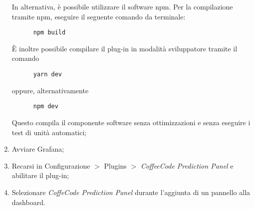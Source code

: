 \documentclass[../manuale-sviluppatore.tex]{subfiles}
\begin{document}
\begin{enumerate}
\begin{verbatim}
    \end{verbatim}
    In alternativa, è possibile utilizzare il software npm. Per la compilazione tramite npm, eseguire il seguente comando da terminale:
    \begin{verbatim}
      npm build
    \end{verbatim}
    È inoltre possibile compilare il plug-in in modalità sviluppatore tramite il comando
    \begin{verbatim}
      yarn dev
    \end{verbatim}
    oppure, alternativamente
    \begin{verbatim}
      npm dev
    \end{verbatim}
    Questo compila il componente software senza ottimizzazioni e senza eseguire i test di unità automatici;
    \item Avviare Grafana;
    \item Recarsi in Configurazione $>$ Plugins $>$ \emph{CoffeeCode Prediction Panel} e abilitare il plug-in;
    \item Selezionare \emph{CoffeCode Prediction Panel} durante l'aggiunta di un pannello alla dashboard.
\end{enumerate}
\end{document}
